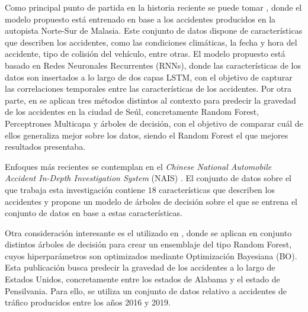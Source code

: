 \documentclass{uathesis-es}
\begin{document}
Como principal punto de partida en la historia reciente se puede tomar \cite{app7060476}, donde el modelo propuesto está entrenado en base a los accidentes producidos en la autopista Norte-Sur de Malasia. Este conjunto de datos dispone de características que describen los accidentes, como las condiciones climáticas, la fecha y hora del accidente, tipo de colisión del vehículo, entre otras. El modelo propuesto está basado en Redes Neuronales Recurrentes (RNNs), donde las características de los datos son insertados a lo largo de dos capas LSTM, con el objetivo de capturar las correlaciones temporales entre las características de los accidentes. Por otra parte, en \cite{app10010129} se aplican tres métodos distintos al contexto para predecir la gravedad de los accidentes en la ciudad de Seúl, concretamente Random Forest, Perceptrones Multicapa y árboles de decisión, con el objetivo de comparar cuál de ellos generaliza mejor sobre los datos, siendo el Random Forest el que mejores resultados presentaba.

Enfoques más recientes se contemplan en el \textit{Chinese National Automobile Accident In-Depth Investigation System} (NAIS) \cite{Yang2023}. El conjunto de datos sobre el que trabaja esta investigación contiene $18$ características que describen los accidentes y propone un modelo de árboles de decisión sobre el que se entrena el conjunto de datos en base a estas características.

Otra consideración interesante es el utilizado en \cite{su14031729}, donde se aplican en conjunto distintos árboles de decisión para crear un ensemblaje del tipo Random Forest, cuyos hiperparámetros son optimizados mediante Optimización Bayesiana (BO). Esta publicación busca predecir la gravedad de los accidentes a lo largo de Estados Unidos, concretamente entre los estados de Alabama y el estado de Pensilvania. Para ello, se utiliza un conjunto de datos relativo a accidentes de tráfico producidos entre los años 2016 y 2019.
\end{document}
